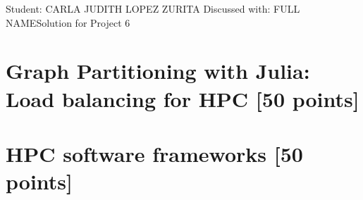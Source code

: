 \documentclass[unicode,11pt,a4paper,oneside,numbers=endperiod,openany]{scrartcl}
\begin{document}
\setassignment
{}

            {Student: CARLA JUDITH LOPEZ ZURITA}
            {Discussed with: FULL NAME}{Solution for Project 6}{}
\newline

\assignmentpolicy

\section{Graph Partitioning with Julia: Load balancing for HPC [50 points]}


\section{HPC software frameworks [50 points]}
\end{document}

